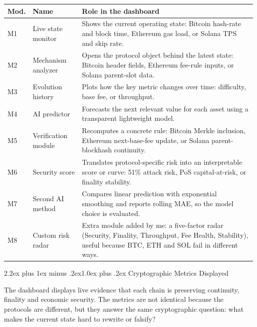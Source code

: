 \documentclass[11pt,a4paper]{article}
\makeatletter
\renewcommand{\section}{\@startsection{section}{1}{0pt}%
  {2.2ex plus 1ex minus .2ex}{1.0ex plus .2ex}%
  {\color{btcgreen}\large\bfseries\sffamily}}
\makeatother
\begin{document}
\begin{center}
\small
\renewcommand{\arraystretch}{1.15}
\begin{tabular}{@{}p{1.25cm}p{3.15cm}p{8.85cm}@{}}
\toprule
\textbf{Mod.} & \textbf{Name} & \textbf{Role in the dashboard} \\
\midrule
M1 & Live state monitor & Shows the current operating state: Bitcoin hash-rate and block time, Ethereum gas load, or Solana TPS and skip rate. \\
M2 & Mechanism analyzer & Opens the protocol object behind the latest state: Bitcoin header fields, Ethereum fee-rule inputs, or Solana parent-slot data. \\
M3 & Evolution history & Plots how the key metric changes over time: difficulty, base fee, or throughput. \\
M4 & AI predictor & Forecasts the next relevant value for each asset using a transparent lightweight model. \\
M5 & Verification module & Recomputes a concrete rule: Bitcoin Merkle inclusion, Ethereum next-base-fee update, or Solana parent-blockhash continuity. \\
M6 & Security score & Translates protocol-specific risk into an interpretable score or curve: 51\% attack risk, PoS capital-at-risk, or finality stability. \\
M7 & Second AI method & Compares linear prediction with exponential smoothing and reports rolling MAE, so the model choice is evaluated. \\
M8 & Custom risk radar & Extra module added by me: a five-factor radar (Security, Finality, Throughput, Fee Health, Stability), useful because BTC, ETH and SOL fail in different ways. \\
\bottomrule
\end{tabular}
\end{center}

\section{Cryptographic Metrics Displayed}

The dashboard displays live evidence that each chain is preserving continuity,
finality and economic security. The metrics are not identical because the
protocols are different, but they answer the same cryptographic question: what
makes the current state hard to rewrite or falsify?
\end{document}
